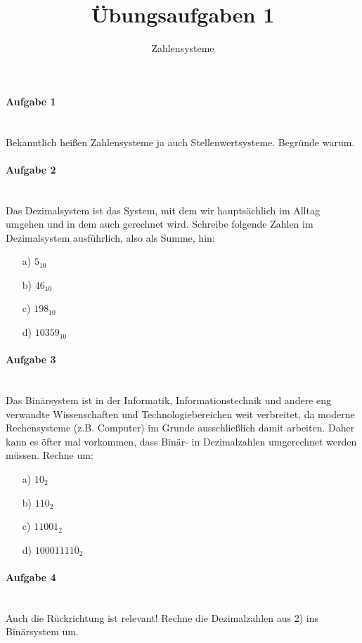 \documentclass[12pt,a4paper,ngerman]{scrartcl}
\title{Übungsaufgaben 1}
\subtitle{Zahlensysteme}
\date{}
\begin{document}
	\maketitle
	
	\paragraph{Aufgabe 1}\mbox{}\\
	Bekanntlich heißen Zahlensysteme ja auch Stellenwertsysteme. Begründe warum.
	
	\paragraph{Aufgabe 2}\mbox{}\\
	Das Dezimalsystem ist das System, mit dem wir hauptsächlich im Alltag umgehen und in dem auch gerechnet wird. Schreibe folgende Zahlen im Dezimalsystem ausführlich, also als Summe, hin:
	\begin{itemize}
		\item[a)] $5_{10}$
		\item[b)] $46_{10}$
		\item[c)] $198_{10}$
		\item[d)] $10359_{10}$
	\end{itemize}
	
	\paragraph{Aufgabe 3}\mbox{}\\	
	Das Binärsystem ist in der Informatik, Informationstechnik und andere eng verwandte Wissenschaften und Technologiebereichen weit verbreitet, da moderne Rechensysteme (z.B. Computer) im Grunde ausschließlich damit arbeiten. Daher kann es öfter mal vorkommen, dass Binär- in Dezimalzahlen umgerechnet werden müssen. Rechne um: 
	\begin{itemize}
		\item[a)] $10_{2}$
		\item[b)] $110_{2}$
		\item[c)] $11001_{2}$
		\item[d)] $100011110_{2}$
	\end{itemize}
	
	\paragraph{Aufgabe 4}\mbox{}\\	
	Auch die Rückrichtung ist relevant! Rechne die Dezimalzahlen aus 2) ins Binärsystem um.
	
\end{document}
